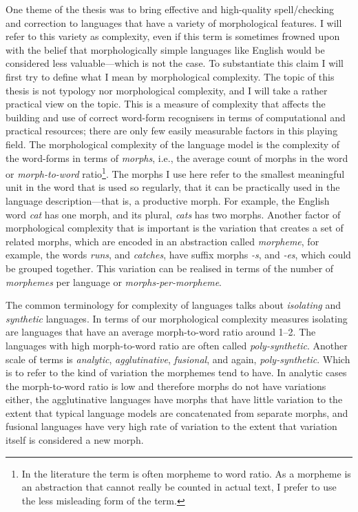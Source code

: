 \documentclass[officiallayout]{unihelcompling}
\begin{document}
One theme of the thesis was to bring effective and high-quality spell\-/checking
and correction to languages that have a variety of morphological features. I
will refer to this variety as complexity, even if this term is sometimes
frowned upon with the belief that morphologically simple languages like English
would be considered less valuable---which is not the case.  To substantiate
this claim I will first try to define what I mean by morphological complexity.
The topic of this thesis is not typology nor morphological complexity, and I
will take a rather practical view on the topic.  This is a measure of
complexity that affects the building and use of correct word-form recognisers
in terms of computational and practical resources; there are only few easily
measurable factors in this playing field. The morphological complexity of the
language model is the complexity of the word-forms in terms of \emph{morphs},
i.e., the average count of morphs in the word or \emph{morph-to-word}
ratio\footnote{In the literature the term is often morpheme to word ratio. As a
morpheme is an abstraction that cannot really be counted in actual text, I
prefer to use the less misleading form of the term.}. The morphs I use here
refer to the smallest meaningful unit in the word that is used so regularly,
that it can be practically used in the language description---that is, a
productive morph. For example, the English word \emph{cat} has one morph, and
its plural, \emph{cats} has two morphs.  Another factor of morphological
complexity that is important is the variation that creates a set of related
morphs, which are encoded in an abstraction called \emph{morpheme}, for
example, the words \emph{runs}, and \emph{catches}, have suffix morphs
\emph{-s}, and \emph{-es}, which could be grouped together. This variation can
be realised in terms of the number of \emph{morphemes} per language or
\emph{morphs-per-morpheme}.

The common terminology for complexity of languages talks about \emph{isolating}
and \emph{synthetic} languages. In terms of our morphological complexity
measures isolating are languages that have an average morph-to-word ratio
around 1--2. The languages with high morph-to-word ratio are often called
\emph{poly-synthetic}. Another scale of terms is \emph{analytic},
\emph{agglutinative}, \emph{fusional}, and again, \emph{poly-synthetic}. Which
is to refer to the kind of variation the morphemes tend to have. In analytic
cases the morph-to-word ratio is low and therefore morphs do not have
variations either, the agglutinative languages have morphs that have little
variation to the extent that typical language models are concatenated from
separate morphs, and fusional languages have very high rate of variation to the
extent that variation itself is considered a new morph. 
\end{document}

